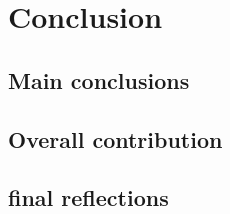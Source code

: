 \chapter{Conclusion} \label{ch:conclusion}

\section{Main conclusions}

\section{Overall contribution}

\section{final reflections}
